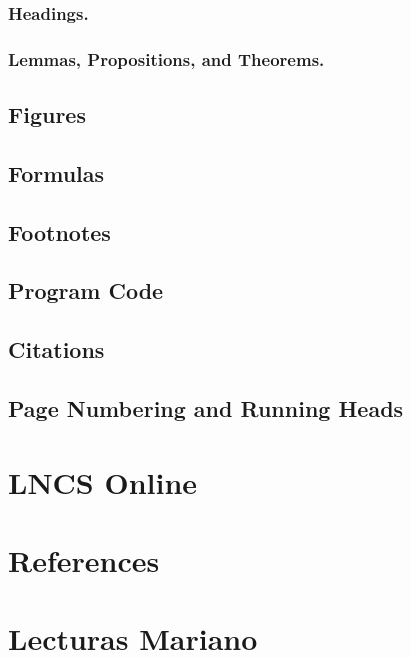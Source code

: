 \documentclass[runningheads,a4paper]{llncs}
\begin{document}
\subsubsection{Headings.}



\subsubsection{Lemmas, Propositions, and Theorems.}



\subsection{Figures}





\subsection{Formulas}




\subsection{Footnotes}



\subsection{Program Code}


\subsection{Citations}


\subsection{Page Numbering and Running Heads}


\section{LNCS Online}




\section{References}


\section{Lecturas Mariano}
\end{document}
